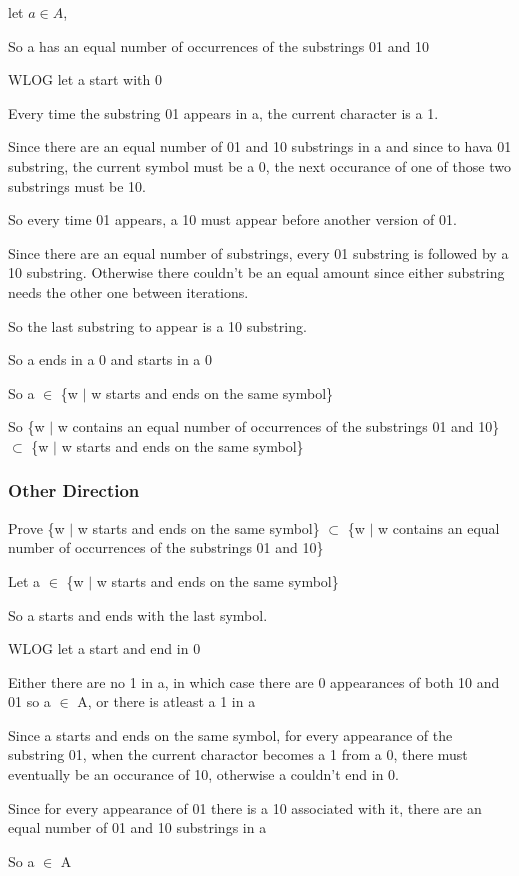 \documentclass[letterpaper, 11pt]{article}
\begin{document}
let $a \in A$,

So a has an equal number of occurrences of the substrings 01 and 10

WLOG let a start with 0

Every time the substring 01 appears in a, the current character is a 1.

Since there are an equal number of 01 and 10 substrings in a and since to hava 01 substring, the current symbol must be a 0, the next occurance of one of those two substrings must be 10.

So every time 01 appears, a 10 must appear before another version of 01.

Since there are an equal number of substrings, every 01 substring is followed by a 10 substring. Otherwise there couldn't be an equal amount since either substring needs the other one between iterations.

So the last substring to appear is a 10 substring.

So a ends in a 0 and starts in a 0

So a $\in$ \{w $\mid$ w starts and ends on the same symbol\}

So \{w $\mid$ w contains an equal number of occurrences of the substrings 01 and 10\} $\subset$ \{w $\mid$ w starts and ends on the same symbol\}
\subsubsection*{Other Direction}
Prove \{w $\mid$ w starts and ends on the same symbol\} $\subset$ \{w $\mid$ w contains an equal number of occurrences of the substrings 01 and 10\}

Let a $\in$ \{w $\mid$ w starts and ends on the same symbol\}

So a starts and ends with the last symbol.

WLOG let a start and end in 0

Either there are no 1 in a, in which case there are 0 appearances of both 10 and 01 so a $\in$ A, or there is atleast a 1 in a

Since a starts and ends on the same symbol, for every appearance of the substring 01, when the current charactor becomes a 1 from a 0, there must eventually be an occurance of 10, otherwise a couldn't end in 0.

Since for every appearance of 01 there is a 10 associated with it, there are an equal number of 01 and 10 substrings in a

So a $\in$ A
\end{document}

